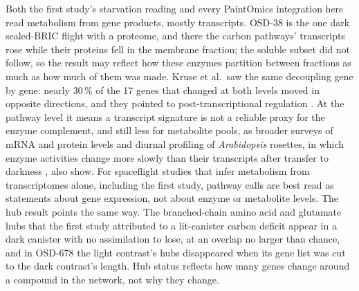 \documentclass{npjlayout}
\begin{document}
Both the first study's starvation reading \citep{firststudy} and every PaintOmics integration here
read metabolism from gene products, mostly transcripts. OSD-38 is the one dark sealed-BRIC flight with a proteome, and there the carbon
pathways' transcripts rose while their proteins fell in the membrane fraction; the soluble subset did
not follow, so the result may reflect how these enzymes partition between fractions as much as how
much of them was made. Kruse et al.\ saw the same decoupling
gene by gene: nearly 30\,\% of the 17 genes that changed at both levels moved in opposite
directions, and they pointed to post-transcriptional regulation \citep{kruse2020}. At the pathway
level it means a transcript signature is not a reliable proxy for the enzyme complement, and still
less for metabolite pools, as broader surveys of mRNA and protein levels \citep{liu2016} and diurnal
profiling of \textit{Arabidopsis} rosettes, in which enzyme activities change more slowly than their
transcripts after transfer to darkness \citep{gibon2006}, also show. For spaceflight studies that infer
metabolism from transcriptomes alone, including the first study, pathway calls are best read as
statements about gene expression, not about enzyme or metabolite levels. The hub result points the same way. The branched-chain amino acid and
glutamate hubs that the first study attributed to a lit-canister carbon deficit appear in a dark
canister with no assimilation to lose, at an overlap no larger than chance, and in OSD-678 the light
contrast's hubs disappeared when its gene list was cut to the dark contrast's length. Hub status
reflects how many genes change around a compound in the network, not why they change.
\end{document}

